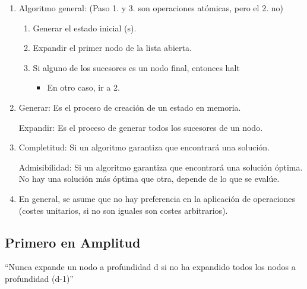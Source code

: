 \documentclass[12pt, twoside, openright]{report} %
\begin{document}
  \begin{enumerate}
  \item
    Algoritmo general: (Paso 1. y 3. son operaciones atómicas, pero el
    2. no)

    \begin{enumerate}
  
    \item
      Generar el estado inicial (s).
    \item
      Expandir el primer nodo de la lista abierta.
    \item
      Si alguno de los sucesores es un nodo final, entonces halt

      \begin{itemize}
    
      \item
        En otro caso, ir a 2.
      \end{itemize}
    \end{enumerate}
  \item
    Generar: Es el proceso de creación de un estado en memoria.

    Expandir: Es el proceso de generar todos los sucesores de un nodo.
  \item
    Completitud: Si un algoritmo garantiza que encontrará una solución.

    Admisibilidad: Si un algoritmo garantiza que encontrará una solución
    óptima. No hay una solución más óptima que otra, depende de lo que
    se evalúe.
  \item
    En general, se asume que no hay preferencia en la aplicación de
    operaciones (costes unitarios, si no son iguales son costes
    arbitrarios).
  \end{enumerate}
\subsection{Primero en Amplitud}

  ``Nunca expande un nodo a profundidad d si no ha expandido todos los
  nodos a profundidad (d-1)''
\end{document}
